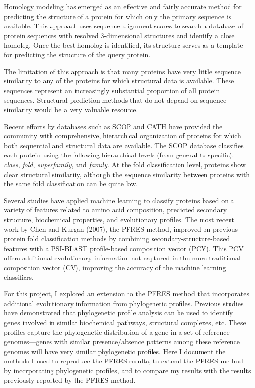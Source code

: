 \documentclass{bioinfo}
\begin{document}
Homology modeling has emerged as an effective and fairly accurate method for predicting the structure of a protein for which only the primary sequence is available.
This approach uses sequence alignment scores to search a database of protein sequences with resolved 3-dimensional structures and identify a close homolog.
Once the best homolog is identified, its structure serves as a template for predicting the structure of the query protein.

The limitation of this approach is that many proteins have very little sequence similarity to any of the proteins for which structural data is available.
These sequences represent an increasingly substantial proportion of all protein sequences.
Structural prediction methods that do not depend on sequence similarity would be a very valuable resource.

Recent efforts by databases such as SCOP \citep{Andreeva} and CATH \citep{Orengo} have provided the community with comprehensive, hierarchical organization of proteins for which both sequential and structural data are available.
The SCOP database classifies each protein using the following hierarchical levels (from general to specific): \textit{class}, \textit{fold}, \textit{superfamily}, and \textit{family}.
At the fold classification level, proteins show clear structural similarity, although the sequence similarity between proteins with the same fold classification can be quite low.

Several studies \citep{Ding,Shen,Chen} have applied machine learning to classify proteins based on a variety of features related to amino acid composition, predicted secondary structure, biochemical properties, and evolutionary profiles.
The most recent work by Chen and Kurgan (2007), the PFRES method, improved on previous protein fold classification methods by combining secondary-structure-based features with a PSI-BLAST profile-based composition vector (PCV).
This PCV offers additional evolutionary information not captured in the more traditional composition vector (CV), improving the accuracy of the machine learning classifiers.

For this project, I explored an extension to the PFRES method that incorporates additional evolutionary information from phylogenetic profiles.
Previous studies \citep{Pellegrini,Wu} have demonstrated that phylogenetic profile analysis can be used to identify genes involved in similar biochemical pathways, structural complexes, etc.
These profiles capture the phylogenetic distribution of a gene in a set of reference genomes---genes with similar presence/absence patterns among these reference genomes will have very similar phylogenetic profiles.
Here I document the methods I used to reproduce the PFRES results, to extend the PFRES method by incorporating phylogenetic profiles, and to compare my results with the results previously reported by the PFRES method.
\end{document}
